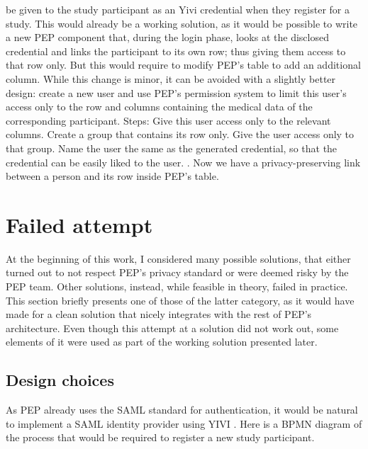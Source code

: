 \documentclass{report}
\begin{document}
be given to the study participant as an Yivi credential when they register for a study. This would already be a working solution, as it would be possible to write a new PEP
component that, during the login phase, looks at the disclosed credential and links the participant to its own row; thus giving them access to that row only. But this would require
to modify PEP's table to add an additional column. While this change is minor, it can be avoided with a slightly better design: create a new user and use PEP's permission system to limit this user's access only to the row and columns containing the medical data of the corresponding participant. Steps: Give this user access only to the relevant columns. Create a group that contains its row only. Give the user access only to that group. Name the user the same as the
generated credential, so that the credential can be easily liked to the user. . Now we have a privacy-preserving link between a person and
its row inside PEP's table.  

\section{Failed attempt}
At the beginning of this work, I considered many possible solutions, that either turned out to not respect PEP's privacy standard or were deemed risky by the PEP team. Other
solutions, instead, while feasible in theory, failed in practice. This section briefly presents one of those of the latter category, as it would have made for a clean solution that
nicely integrates with the rest of PEP's architecture. Even though this attempt at a solution did not work out, some elements of it were used as part of the working solution
presented later.\par

\subsection{Design choices}
As PEP already uses the SAML standard \cite{sstc-saml-core-errata-2.0-wd-07} for authentication, it would be natural to implement a SAML identity provider using YIVI \cite{irma-app}.
Here is a BPMN diagram of the process that would be required to register a new study participant.
\end{document}
